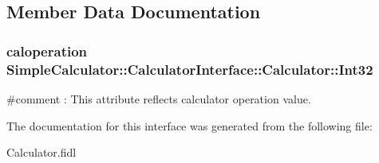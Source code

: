 \subsection{Member Data Documentation}
\hypertarget{interfaceSimpleCalculator_1_1CalculatorInterface_1_1Calculator_a6597107e705165bc1d27edd6c03210e4}{
\subsubsection[{Int32}]{\setlength{\rightskip}{0pt plus 5cm}caloperation Simple\-Calculator\-::\-Calculator\-Interface\-::\-Calculator\-::\-Int32}}\label{interfaceSimpleCalculator_1_1CalculatorInterface_1_1Calculator_a6597107e705165bc1d27edd6c03210e4}
\#comment \-: This attribute reflects calculator operation value. 

The documentation for this interface was generated from the following file\-:\begin{DoxyCompactItemize}
\item 
Calculator.\-fidl\end{DoxyCompactItemize}
